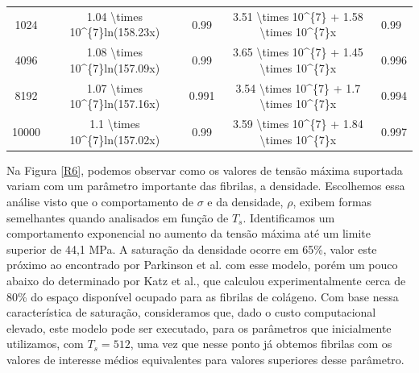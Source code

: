 \documentclass{report}
\begin{document}
\begin{table}[H]
\begin{tabular}{ccccl}
            1024             & 1.04 \textbackslash{}times 10\textasciicircum{}\{7\}ln(158.23x) & 0.99                              & 3.51 \textbackslash{}times 10\textasciicircum{}\{7\} + 1.58 \textbackslash{}times 10\textasciicircum{}\{7\}x & 0.99                     \\
            4096             & 1.08 \textbackslash{}times 10\textasciicircum{}\{7\}ln(157.09x) & 0.99                              & 3.65 \textbackslash{}times 10\textasciicircum{}\{7\} + 1.45 \textbackslash{}times 10\textasciicircum{}\{7\}x & 0.996                    \\
            8192             & 1.07 \textbackslash{}times 10\textasciicircum{}\{7\}ln(157.16x) & 0.991                             & 3.54 \textbackslash{}times 10\textasciicircum{}\{7\} + 1.7 \textbackslash{}times 10\textasciicircum{}\{7\}x  & 0.994                    \\
            10000            & 1.1 \textbackslash{}times 10\textasciicircum{}\{7\}ln(157.02x)  & 0.99                              & 3.59 \textbackslash{}times 10\textasciicircum{}\{7\} + 1.84 \textbackslash{}times 10\textasciicircum{}\{7\}x & 0.997                    \\ \hline
            \end{tabular}
            \label{tab2}
        \end{table}


        Na Figura \ref{R6}, podemos observar como os valores de tensão máxima suportada variam com um parâmetro 
        importante das fibrilas, a densidade. Escolhemos essa análise visto que o comportamento de \(\sigma\) e da 
        densidade, \(\rho\), exibem formas semelhantes quando analisados em função de \(T_{s}\). Identificamos um 
        comportamento exponencial no aumento da tensão máxima até um limite superior de 44,1 MPa. A saturação da 
        densidade ocorre em 65\%, valor este próximo ao encontrado por Parkinson et al.\cite{Parkinson1995} com esse 
        modelo, porém um pouco abaixo do determinado por Katz et al.\cite{KATZ1973351}, que calculou experimentalmente 
        cerca de 80\% do espaço disponível ocupado para as fibrilas de colágeno. Com base nessa característica de 
        saturação, consideramos que, dado o custo computacional elevado, este modelo pode ser executado, para os parâmetros 
        que inicialmente utilizamos, com \(T_{s}=512\), uma vez que nesse ponto já obtemos fibrilas com os valores de 
        interesse médios equivalentes para valores superiores desse parâmetro. 
\end{document}
